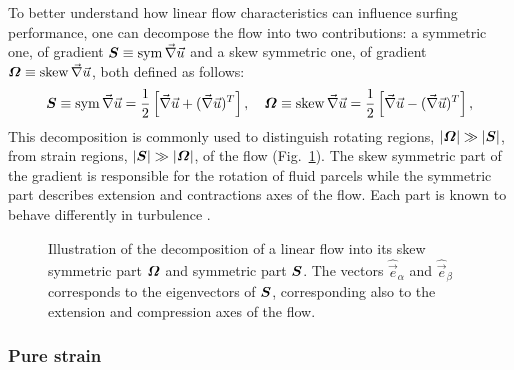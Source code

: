 To better understand how linear flow characteristics can influence surfing performance, one can decompose the flow into two contributions: a symmetric one, of gradient $\boldsymbol{S} \equiv \operatorname{sym} \vec{\nabla} \vec{u}$ and a skew symmetric one, of gradient $\boldsymbol{\varOmega} \equiv \operatorname{skew} \vec{\nabla} \vec{u}$, both defined as follows:
\begin{equation}\label{eq:sym_def}
	\boldsymbol{S} \equiv \operatorname{sym} \vec{\nabla} \vec{u} = \frac{1}{2} \left[ \vec{\nabla} \vec{u} + (\vec{\nabla} \vec{u})^T \right], \quad \boldsymbol{\varOmega} \equiv \operatorname{skew} \vec{\nabla} \vec{u} = \frac{1}{2} \left[ \vec{\nabla} \vec{u} - (\vec{\nabla} \vec{u})^T \right],
\end{equation}
This decomposition is commonly used to distinguish rotating regions, $\lvert\boldsymbol{\varOmega}\rvert \gg \lvert\boldsymbol{S}\rvert$, from strain regions, $\lvert\boldsymbol{S}\rvert \gg \lvert\boldsymbol{\varOmega}\rvert$, of the flow (Fig.~\ref{fig:decomposition}).
The skew symmetric part of the gradient is responsible for the rotation of fluid parcels while the symmetric part describes extension and contractions axes of the flow.
Each part is known to behave differently in turbulence \citep{meneveau2011lagrangian, fang2015short}.
\begin{figure}%
	\centering
	
	\caption[Illustration of the decomposition of a linear flow into its skew symmetric part $\GradientsAsym$ and symmetric part $\GradientsSym$.]{
		Illustration of the decomposition of a linear flow into its skew symmetric part $\GradientsAsym$ and symmetric part $\GradientsSym$. The vectors $\hat{\vec{e}}_\alpha$ and $\hat{\vec{e}}_\beta$ corresponds to the eigenvectors of $\GradientsSym$, corresponding also to the extension and compression axes of the flow.
	}
	\label{fig:decomposition}
\end{figure}

\subsubsection{Pure strain}\label{sec:the_surfing_strategy_linear_sym}

